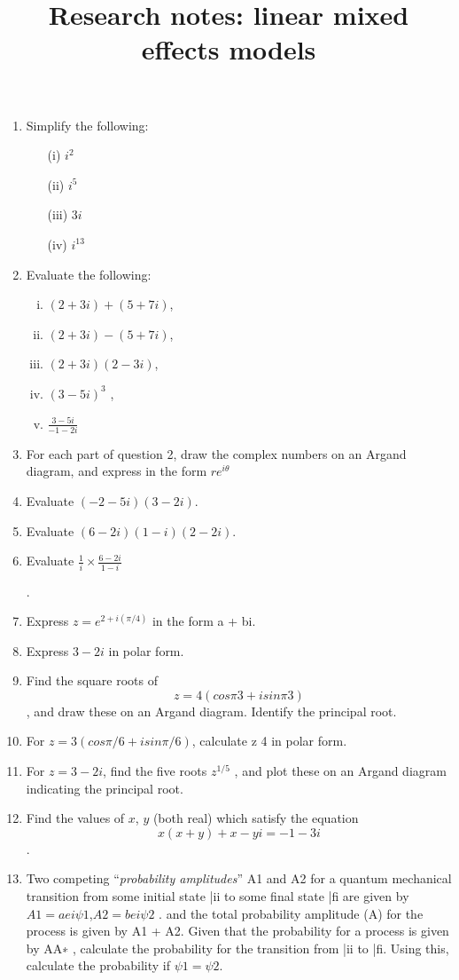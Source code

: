 \documentclass[12pt, a4paper]{report}
\title{Research notes: linear mixed effects models}
\author{ } \date{ }
\theoremstyle{plain}
\theoremstyle{definition}
\theoremstyle{remark}
\begin{document}
\begin{enumerate}
\item Simplify the following:
\begin{multicols}{2}
\begin{itemize}
	\item[(i)]  $i^2$
	\item[(ii)]  $i^5$
	\item[(iii)]  $3i$
	\item[(iv)]  $i^13$
\end{itemize}
\end{multicols}
\item Evaluate the following:
\begin{multicols}{2}
\begin{enumerate}[(i)]
	\item $(2 + 3i) + (5 + 7i)$,
	\item $(2 + 3i) − (5 + 7i)$,
	\item $(2 + 3i)(2 − 3i)$,
	\item $(3 − 5i)^3$
	,
	\item ${\displaystyle \frac{3 − 5i}{	−1 − 2i} }$


\end{enumerate}
\end{multicols}


\item For each part of question 2, draw the complex numbers on an Argand diagram, and express in
the form $re^{i\theta}$

\item Evaluate $(-2 - 5i)(3- 2i)$.
\item Evaluate $(6 - 2i)(1 - i)(2 - 2i)$.
\item Evaluate 
${\displaystyle \frac{1}{i} \times \frac{6-2i}{1-i} }$


.
\item Express $z = e^{2+i(\pi/4)}$ in the form a + bi.
\item Express $3 - 2i$ in polar form.
\item Find the square roots of \[z = 4(cos π
3 + isin π
3
)\], and draw these on an Argand diagram. Identify
the principal root.
\item For $z = 3(cos \pi/6 + isin \pi/6)$, calculate z
4
in polar form.
\item For $z = 3 - 2i$, find the five roots $z^{1/5}$
, and plot these on an Argand diagram indicating the
principal root.


\item Find the values of $x$, $y$ (both real) which satisfy the equation \[ x(x + y) + x − yi = −1 − 3i\].
\item Two competing “\textit{probability amplitudes}” A1 and A2 for a quantum mechanical transition from
some initial state |ii to some final state |fi are given by
$A1 = aei\psi1$,$ A2 = bei\psi2$
.
and the total probability amplitude (A) for the process is given by A1 + A2. Given that the probability
for a process is given by AA∗
, calculate the probability for the transition from |ii to |fi.
Using this, calculate the probability if $\psi1 = \psi2$.


\end{enumerate}
\end{document}
